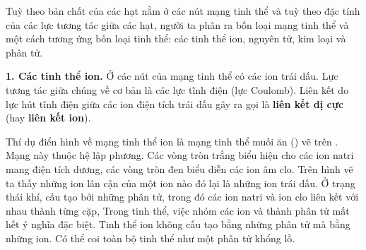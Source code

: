 Tuỳ theo bản chất của các hạt nằm ở các nút mạng tinh thể và tuỳ theo đặc tính của các lực tương tác giữa các hạt, người ta phân ra bốn loại mạng tinh thể và một cách tương ứng bốn loại tinh thể: các tinh thể ion, nguyên tử, kim loại và phân tử.


\textbf{1. Các tinh thể ion.} Ở các nút của mạng tinh thể có các ion trái dấu. Lực tương tác giữa chúng về cơ bản là các lực tĩnh điện (lực Coulomb). Liên kết do lực hút tĩnh điện giữa các ion điện tích trái dấu gây ra gọi là \textbf{liên kết dị cực} (hay \textbf{liên kết ion}).


Thí dụ điển hình về mạng tinh thể ion là mạng tinh thể muối ăn () vẽ trên . Mạng này thuộc hệ lập phương. Các vòng tròn trắng biểu hiện cho các ion natri mang điện tích dương, các vòng tròn đen biểu diễn các ion âm clo. Trên hình vẽ ta thấy những ion lân cận của một ion nào đó lại là những ion trái dấu. Ở trạng thái khí,  cấu tạo bởi những phân tử, trong đó các ion natri và ion clo liên kết với nhau thành từng cặp, Trong tinh thể, việc nhóm các ion  và  thành phân tử mất hết ý nghĩa đặc biệt. Tinh thể ion không cấu tạo bằng những phân tử mà bằng những ion. Có thể coi toàn bộ tinh thể như một phân tử khổng lồ.

